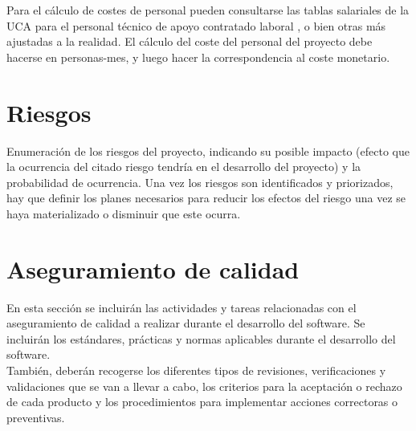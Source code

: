 Para el cálculo de costes de personal pueden consultarse las tablas salariales de la UCA para el personal técnico de apoyo contratado laboral \cite{paslaboral}, o bien otras más ajustadas a la realidad. El cálculo del coste del personal del proyecto debe hacerse en personas-mes, y luego hacer la correspondencia al coste monetario.\\

\section{Riesgos}
Enumeración de los riesgos del proyecto, indicando su posible impacto (efecto que la ocurrencia del citado riesgo tendría en el desarrollo del proyecto) y la probabilidad de ocurrencia. Una vez los riesgos son identificados y priorizados, hay que definir los planes necesarios para reducir los efectos del riesgo una vez se haya materializado o disminuir que este ocurra.\\

\section{Aseguramiento de calidad}
En esta sección se incluirán las actividades y tareas relacionadas con el aseguramiento de calidad a realizar durante el desarrollo del software. Se incluirán los estándares, prácticas y normas aplicables durante el desarrollo del software.\\

También, deberán recogerse los diferentes tipos de revisiones, verificaciones y validaciones que se van a llevar a cabo, los criterios para la aceptación o rechazo de cada producto y los procedimientos para implementar acciones correctoras o preventivas.
